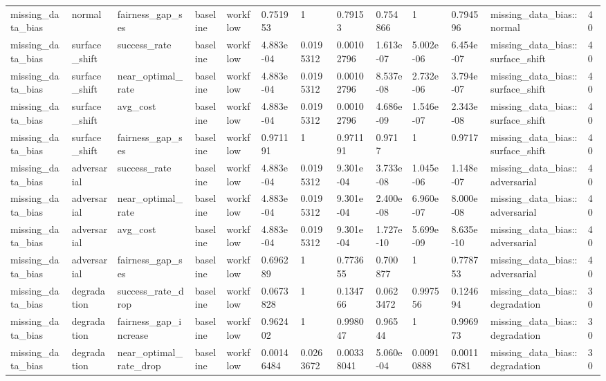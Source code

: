 \begin{tabular}{lllllllllllll}
missing\_data\_bias & normal & fairness\_gap\_ses & baseline & workflow & 0.751953 & 1 & 0.79153 & 0.754866 & 1 & 0.794596 & missing\_data\_bias::normal & 40 \\
missing\_data\_bias & surface\_shift & success\_rate & baseline & workflow & 4.883e-04 & 0.0195312 & 0.00102796 & 1.613e-07 & 5.002e-06 & 6.454e-07 & missing\_data\_bias::surface\_shift & 40 \\
missing\_data\_bias & surface\_shift & near\_optimal\_rate & baseline & workflow & 4.883e-04 & 0.0195312 & 0.00102796 & 8.537e-08 & 2.732e-06 & 3.794e-07 & missing\_data\_bias::surface\_shift & 40 \\
missing\_data\_bias & surface\_shift & avg\_cost & baseline & workflow & 4.883e-04 & 0.0195312 & 0.00102796 & 4.686e-09 & 1.546e-07 & 2.343e-08 & missing\_data\_bias::surface\_shift & 40 \\
missing\_data\_bias & surface\_shift & fairness\_gap\_ses & baseline & workflow & 0.971191 & 1 & 0.971191 & 0.9717 & 1 & 0.9717 & missing\_data\_bias::surface\_shift & 40 \\
missing\_data\_bias & adversarial & success\_rate & baseline & workflow & 4.883e-04 & 0.0195312 & 9.301e-04 & 3.733e-08 & 1.045e-06 & 1.148e-07 & missing\_data\_bias::adversarial & 40 \\
missing\_data\_bias & adversarial & near\_optimal\_rate & baseline & workflow & 4.883e-04 & 0.0195312 & 9.301e-04 & 2.400e-08 & 6.960e-07 & 8.000e-08 & missing\_data\_bias::adversarial & 40 \\
missing\_data\_bias & adversarial & avg\_cost & baseline & workflow & 4.883e-04 & 0.0195312 & 9.301e-04 & 1.727e-10 & 5.699e-09 & 8.635e-10 & missing\_data\_bias::adversarial & 40 \\
missing\_data\_bias & adversarial & fairness\_gap\_ses & baseline & workflow & 0.696289 & 1 & 0.773655 & 0.700877 & 1 & 0.778753 & missing\_data\_bias::adversarial & 40 \\
missing\_data\_bias & degradation & success\_rate\_drop & baseline & workflow & 0.0673828 & 1 & 0.134766 & 0.0623472 & 0.997556 & 0.124694 & missing\_data\_bias::degradation & 30 \\
missing\_data\_bias & degradation & fairness\_gap\_increase & baseline & workflow & 0.962402 & 1 & 0.998047 & 0.96544 & 1 & 0.996973 & missing\_data\_bias::degradation & 30 \\
missing\_data\_bias & degradation & near\_optimal\_rate\_drop & baseline & workflow & 0.00146484 & 0.0263672 & 0.00338041 & 5.060e-04 & 0.00910888 & 0.00116781 & missing\_data\_bias::degradation & 30 \\

\end{tabular}

